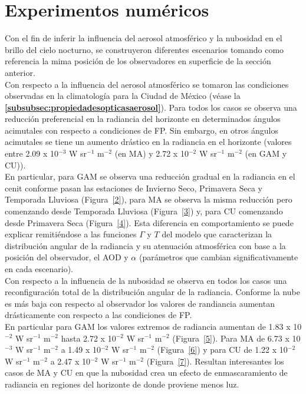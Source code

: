 \newpage

\section{Experimentos numéricos}

Con el fin de inferir la influencia del aerosol atmosférico y la nubosidad en el brillo del cielo nocturno, se construyeron diferentes escenarios tomando como referencia la mima posición de los observadores en superficie de la sección anterior.\\

Con respecto a la influencia del aerosol atmosférico se tomaron las condiciones observadas en la climatología para la Ciudad de México (véase la \textbf{\autoref{subsubsec:propiedadesopticasaerosol}}). Para todos los casos se observa una reducción preferencial en la radiancia del horizonte en determinados ángulos acimutales con respecto a condiciones de FP. Sin embargo, en otros ángulos acimutales se tiene un aumento drástico en la radiancia en el horizonte (valores entre 2.09 x 10$^{-3}$ W sr$^{-1}$ m$^{-2}$ (en MA) y 2.72 x 10$^{-2}$ W sr$^{-1}$ m$^{-2}$ (en GAM y CU)).\\

En particular, para GAM se observa una reducción gradual en la radiancia en el cenit conforme pasan las estaciones de Invierno Seco, Primavera Seca y Temporada Lluviosa (Figura~\ref{2}), para MA se observa la misma reducción pero comenzando desde Temporada Lluviosa (Figura~\ref{3}) y, para CU comenzando desde Primavera Seca (Figura~\ref{4}). Esta diferencia en comportamiento se puede explicar remitiéndose a las funciones $\Gamma$ y $T$ del modelo que caracterizan la distribución angular de la radiancia y su atenuación atmosférica con base a la posición del observador, el AOD y $\alpha$ (parámetros que cambian significativamente en cada escenario).\\

Con respecto a la influencia de la nubosidad se observa en todos los casos una reconfiguración total de la distribución angular de la radiancia. Conforme la nube es más baja con respecto al observador los valores de randiancia aumentan drásticamente con respecto a las condiciones de FP.\\

En particular para GAM los valores extremos de radiancia aumentan de 1.83 x 10$^{-2}$ W sr$^{-1}$ m$^{-2}$ hasta 2.72 x 10$^{-2}$ W sr$^{-1}$ m$^{-2}$ (Figura~\ref{5}). Para MA de 6.73 x 10$^{-3}$ W sr$^{-1}$ m$^{-2}$ a 1.49 x 10$^{-2}$ W sr$^{-1}$ m$^{-2}$ (Figura~\ref{6}) y para CU de 1.22 x 10$^{-2}$ W sr$^{-1}$ m$^{-2}$ a 2.47 x 10$^{-2}$ W sr$^{-1}$ m$^{-2}$ (Figura~\ref{7}). Resultan interesantes los casos de MA y CU en que la nubosidad crea un efecto de enmascaramiento de radiancia en regiones del horizonte de donde proviene menos luz.\\

